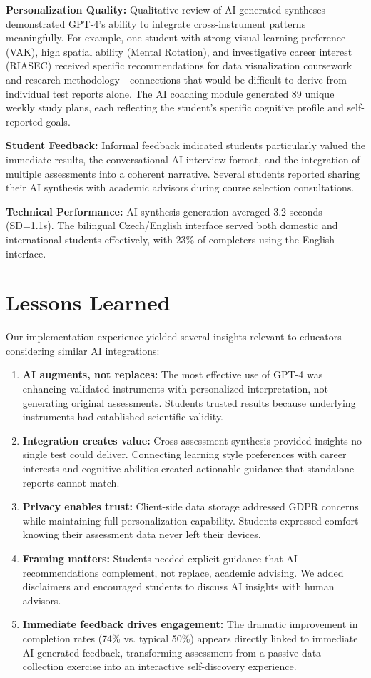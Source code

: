 \documentclass[11pt,a4paper]{article}
\begin{document}
\textbf{Personalization Quality:} Qualitative review of AI-generated syntheses demonstrated GPT-4's ability to integrate cross-instrument patterns meaningfully. For example, one student with strong visual learning preference (VAK), high spatial ability (Mental Rotation), and investigative career interest (RIASEC) received specific recommendations for data visualization coursework and research methodology---connections that would be difficult to derive from individual test reports alone. The AI coaching module generated 89 unique weekly study plans, each reflecting the student's specific cognitive profile and self-reported goals.

\textbf{Student Feedback:} Informal feedback indicated students particularly valued the immediate results, the conversational AI interview format, and the integration of multiple assessments into a coherent narrative. Several students reported sharing their AI synthesis with academic advisors during course selection consultations.

\textbf{Technical Performance:} AI synthesis generation averaged 3.2 seconds (SD=1.1s). The bilingual Czech/English interface served both domestic and international students effectively, with 23\% of completers using the English interface.

\section{Lessons Learned}

Our implementation experience yielded several insights relevant to educators considering similar AI integrations:

\begin{enumerate}[noitemsep]
    \item \textbf{AI augments, not replaces:} The most effective use of GPT-4 was enhancing validated instruments with personalized interpretation, not generating original assessments. Students trusted results because underlying instruments had established scientific validity.
    \item \textbf{Integration creates value:} Cross-assessment synthesis provided insights no single test could deliver. Connecting learning style preferences with career interests and cognitive abilities created actionable guidance that standalone reports cannot match.
    \item \textbf{Privacy enables trust:} Client-side data storage addressed GDPR concerns while maintaining full personalization capability. Students expressed comfort knowing their assessment data never left their devices.
    \item \textbf{Framing matters:} Students needed explicit guidance that AI recommendations complement, not replace, academic advising. We added disclaimers and encouraged students to discuss AI insights with human advisors.
    \item \textbf{Immediate feedback drives engagement:} The dramatic improvement in completion rates (74\% vs. typical 50\%) appears directly linked to immediate AI-generated feedback, transforming assessment from a passive data collection exercise into an interactive self-discovery experience.
\end{enumerate}
\end{document}
